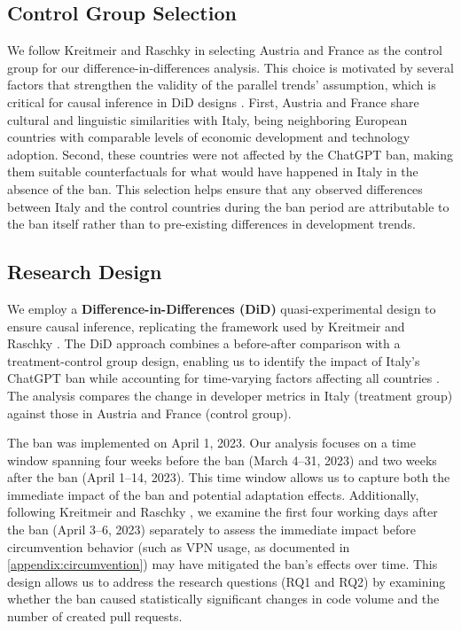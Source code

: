 \subsection{Control Group Selection}

We follow Kreitmeir and Raschky \cite[p.~4]{Kreitmeir2023} in selecting Austria and France as the control group for our difference-in-differences analysis. This choice is motivated by several factors that strengthen the validity of the parallel trends' assumption, which is critical for causal inference in DiD designs \cite[p.~171]{mostly_harmless_econometrics}. First, Austria and France share cultural and linguistic similarities with Italy, being neighboring European countries with comparable levels of economic development and technology adoption. Second, these countries were not affected by the ChatGPT ban, making them suitable counterfactuals for what would have happened in Italy in the absence of the ban. This selection helps ensure that any observed differences between Italy and the control countries during the ban period are attributable to the ban itself rather than to pre-existing differences in development trends.

\subsection{Research Design}

We employ a \textbf{Difference-in-Differences (DiD)} quasi-experimental design to ensure causal inference, replicating the framework used by Kreitmeir and Raschky \cite[p.~6]{Kreitmeir2023}. The DiD approach combines a before-after comparison with a treatment-control group design, enabling us to identify the impact of Italy's ChatGPT ban while accounting for time-varying factors affecting all countries \cite[pp.~520--522]{fredriksson2019impact}. The analysis compares the change in developer metrics in Italy (treatment group) against those in Austria and France (control group).

The ban was implemented on April 1, 2023. Our analysis focuses on a time window spanning four weeks before the ban (March 4--31, 2023) and two weeks after the ban (April 1--14, 2023). This time window allows us to capture both the immediate impact of the ban and potential adaptation effects. Additionally, following Kreitmeir and Raschky \cite[p.~7]{Kreitmeir2023}, we examine the first four working days after the ban (April 3--6, 2023) separately to assess the immediate impact before circumvention behavior (such as VPN usage, as documented in \autoref{appendix:circumvention}) may have mitigated the ban's effects over time. This design allows us to address the research questions (RQ1 and RQ2) by examining whether the ban caused statistically significant changes in code volume and the number of created pull requests.

